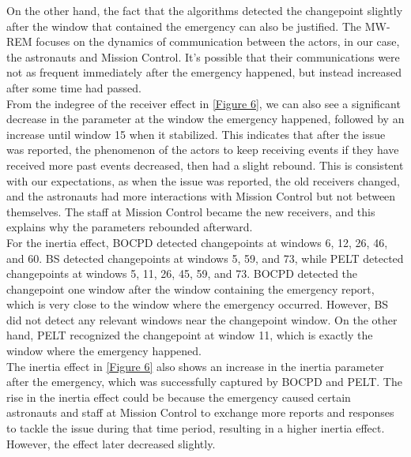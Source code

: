 \documentclass[]{interact}
\theoremstyle{plain}%
\theoremstyle{definition}
\theoremstyle{remark}
\begin{document}
{	On the other hand, the fact that the algorithms detected the changepoint slightly after the window that contained the emergency can also be justified. The MW-REM focuses on the dynamics of communication between the actors, in our case, the astronauts and Mission Control. It's possible that their communications were not as frequent immediately after the emergency happened, but instead increased after some time had passed. \\
	
	From the indegree of the receiver effect in \autoref{Figure 6}, we can also see a significant decrease in the parameter at the window the emergency happened, followed by an increase until window 15 when it stabilized. This indicates that after the issue was reported, the phenomenon of the actors to keep receiving events if they have received more past events decreased, then had a slight rebound. This is consistent with our expectations, as when the issue was reported, the old receivers changed, and the astronauts had more interactions with Mission Control but not between themselves. The staff at Mission Control became the new receivers, and this explains why the parameters rebounded afterward. \\
	
	For the inertia effect, BOCPD detected changepoints at windows 6, 12, 26, 46, and 60. BS detected changepoints at windows 5, 59, and 73, while PELT detected changepoints at windows 5, 11, 26, 45, 59, and 73. BOCPD detected the changepoint one window after the window containing the emergency report, which is very close to the window where the emergency occurred. However, BS did not detect any relevant windows near the changepoint window. On the other hand, PELT recognized the changepoint at window 11, which is exactly the window where the emergency happened. \\
	 
	The inertia effect in \autoref{Figure 6} also shows an increase in the inertia parameter after the emergency, which was successfully captured by BOCPD and PELT. The rise in the inertia effect could be because the emergency caused certain astronauts and staff at Mission Control to exchange more reports and responses to tackle the issue during that time period, resulting in a higher inertia effect. However, the effect later decreased slightly. \\ 
	 
}
\end{document}
